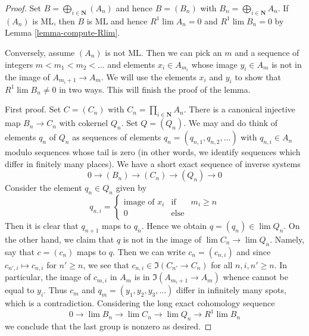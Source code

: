 \begin{proof}
Set $B = \bigoplus_{i \in \mathbf{N}} (A_n)$ and hence
$B = (B_n)$ with $B_n = \bigoplus_{i \in \mathbf{N}} A_n$.
If $(A_n)$ is ML, then $B$ is ML and hence $R^1\lim A_n = 0$ and
$R^1\lim B_n = 0$ by Lemma \ref{lemma-compute-Rlim}.

\medskip\noindent
Conversely, assume $(A_n)$ is not ML. Then we can pick an $m$
and a sequence of integers $m < m_1 < m_2 < \ldots$ and elements
$x_i \in A_{m_i}$ whose image $y_i \in A_m$ is not in the
image of $A_{m_i + 1} \to A_m$.
We will use the elements $x_i$ and $y_i$ to
show that $R^1\lim B_n \not = 0$ in two ways.
This will finish the proof of the lemma.

\medskip\noindent
First proof.
Set $C = (C_n)$ with $C_n = \prod_{i \in \mathbf{N}} A_n$.
There is a canonical injective map $B_n \to C_n$ with cokernel
$Q_n$. Set $Q = (Q_n)$. We may and do think of elements $q_n$ of $Q_n$
as sequences of elements $q_n = (q_{n, 1}, q_{n, 2}, \ldots)$
with $q_{n, i} \in A_n$ modulo sequences whose tail is zero
(in other words, we identify sequences which differ in
finitely many places).
We have a short exact sequence of inverse systems
$$
0 \to (B_n) \to (C_n) \to (Q_n) \to 0
$$
Consider the element $q_n \in Q_n$ given by
$$
q_{n, i} =
\left\{
\begin{matrix}
\text{image of }x_i &\text{if}& m_i \geq n \\
0 & \text{else}
\end{matrix}
\right.
$$
Then it is clear that $q_{n + 1}$ maps to $q_n$.
Hence we obtain $q = (q_n) \in \lim Q_n$.
On the other hand, we claim that $q$ is not in the image
of $\lim C_n \to \lim Q_n$. Namely, say that $c = (c_n)$
maps to $q$. Then we can write $c_n = (c_{n, i})$ and since
$c_{n', i} \mapsto c_{n, i}$ for $n' \geq n$, we see that
$c_{n, i} \in \Im(C_{n'} \to C_n)$ for all $n, i, n' \geq n$.
In particular, the image of $c_{m, i}$ in $A_m$ is in
$\Im(A_{m_i + 1} \to A_m)$ whence cannot be equal to $y_i$.
Thus $c_m$ and $q_m = (y_1, y_2, y_3, \ldots)$
differ in infinitely many spots, which
is a contradiction. Considering the long exact cohomology sequence
$$
0 \to \lim B_n \to \lim C_n \to \lim Q_n \to R^1\lim B_n
$$
we conclude that the last group is nonzero as desired.


\end{proof}
